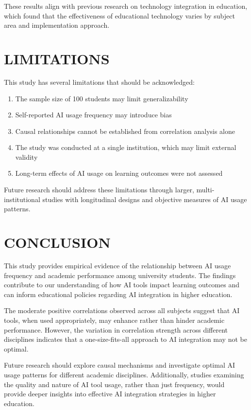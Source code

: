 \documentclass[manuscript,screen,review]{acmart}
\begin{document}
These results align with previous research on technology integration in education, which found that the effectiveness of educational technology varies by subject area and implementation approach.

\section{LIMITATIONS}

This study has several limitations that should be acknowledged:
\begin{enumerate}
\item The sample size of 100 students may limit generalizability
\item Self-reported AI usage frequency may introduce bias
\item Causal relationships cannot be established from correlation analysis alone
\item The study was conducted at a single institution, which may limit external validity
\item Long-term effects of AI usage on learning outcomes were not assessed
\end{enumerate}

Future research should address these limitations through larger, multi-institutional studies with longitudinal designs and objective measures of AI usage patterns.

\section{CONCLUSION}

This study provides empirical evidence of the relationship between AI usage frequency and academic performance among university students. The findings contribute to our understanding of how AI tools impact learning outcomes and can inform educational policies regarding AI integration in higher education.

The moderate positive correlations observed across all subjects suggest that AI tools, when used appropriately, may enhance rather than hinder academic performance. However, the variation in correlation strength across different disciplines indicates that a one-size-fits-all approach to AI integration may not be optimal.

Future research should explore causal mechanisms and investigate optimal AI usage patterns for different academic disciplines. Additionally, studies examining the quality and nature of AI tool usage, rather than just frequency, would provide deeper insights into effective AI integration strategies in higher education.



\end{document}
